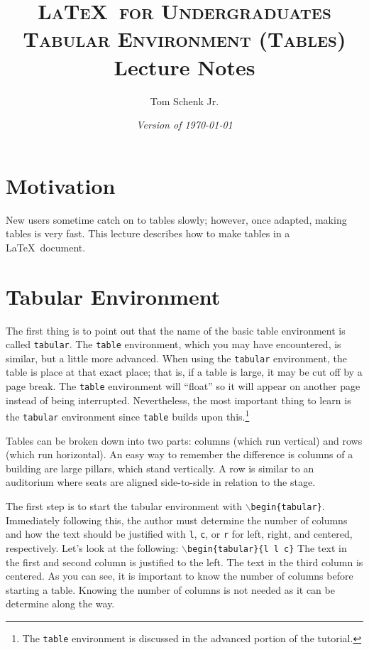 \documentclass{article}
\title{\textsc{\LaTeX\ for Undergraduates\\
			Tabular Environment (Tables)} \\
			Lecture Notes}
\author{Tom Schenk Jr.}
\date{\textit{Version of \today}}
\begin{document}
\maketitle

\section{Motivation}

New users sometime catch on to tables slowly; however, once adapted, making tables is very fast. This lecture describes how to make tables in a \LaTeX\ document.

\section{Tabular Environment}

The first thing is to point out that the name of the basic table environment is called \texttt{tabular}. The \texttt{table} environment, which you may have encountered, is similar, but a little more advanced. When using the \texttt{tabular} environment, the table is place at that exact place; that is, if a table is large, it may be cut off by a page break. The \texttt{table} environment will ``float'' so it will appear on another page instead of being interrupted. Nevertheless, the most important thing to learn is the \texttt{tabular} environment since \texttt{table} builds upon this.\footnote{The \texttt{table} environment is discussed in the advanced portion of the tutorial.}

Tables can be broken down into two parts: columns (which run vertical) and rows (which run horizontal). An easy way to remember the difference is columns of a building are large pillars, which stand vertically. A row is similar to an auditorium where seats are aligned side-to-side in relation to the stage.

The first step is to start the tabular environment with \texttt{$\backslash$begin\{tabular\}}. Immediately following this, the author must determine the number of columns and how the text should be justified with \texttt{l}, \texttt{c}, or \texttt{r} for left, right, and centered, respectively. Let's look at the following:
\texttt{$\backslash$begin\{tabular\}\{l l c\}}
The text in the first and second column is justified to the left. The text in the third column is centered. As you can see, it is important to know the number of columns before starting a table. Knowing the number of columns is not needed as it can be determine along the way.
\end{document}
